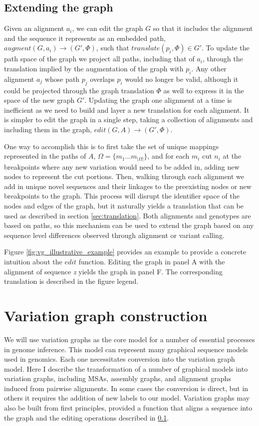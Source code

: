 \subsection{Extending the graph}
\label{sec:extending}

Given an alignment $a_i$, we can edit the graph $G$ so that it includes the alignment and the sequence it represents as an embedded path, $augment(G, a_i) \to (G', \Phi)$, such that $translate(p_i, \Phi) \in G'$.
To update the path space of the graph we project all paths, including that of $a_i$, through the translation implied by the augmentation of the graph with $p_i$.
Any other alignment $a_j$ whose path $p_j$ overlaps $p_i$ would no longer be valid, although it could be projected through the graph translation $\Phi$ as well to express it in the space of the new graph $G'$.
Updating the graph one alignment at a time is inefficient as we need to build and layer a new translation for each alignment.
It is simpler to edit the graph in a single step, taking a collection of alignments and including them in the graph, $edit(G, A) \to (G', \Phi)$.

One way to accomplish this is to first take the set of unique mappings represented in the paths of $A$, $\Omega = \{ m_1 \ldots m_{|\Omega|}\}$, and for each $m_i$ cut $n_i$ at the breakpoints where any new variation would need to be added in, adding new nodes to represent the cut portions.
Then, walking through each alignment we add in unique novel sequences and their linkages to the preexisting nodes or new breakpoints to the graph.
This process will disrupt the identifier space of the nodes and edges of the graph, but it naturally yields a translation that can be used as described in section \ref{sec:translation}.
Both alignments and genotypes are based on paths, so this mechanism can be used to extend the graph based on any sequence level differences observed through alignment or variant calling.

Figure \ref{fig:vg_illustrative_example} provides an example to provide a concrete intuition about the $edit$ function.
Editing the graph in panel A with the alignment of sequence \emph{z} yields the graph in panel F.
The corresponding translation is described in the figure legend.

\section{Variation graph construction}

We will use variation graphs as the core model for a number of essential processes in genome inference.
This model can represent many graphical sequence models used in genomics.
Each one necessitates conversion into the variation graph model.
Here I describe the transformation of a number of graphical models into variation graphs, including MSAs, assembly graphs, and alignment graphs induced from pairwise alignments.
In some cases the conversion is direct, but in others it requires the addition of new labels to our model.
Variation graphs may also be built from first principles, provided a function that aligns a sequence into the graph and the editing operations described in \ref{sec:extending}.

